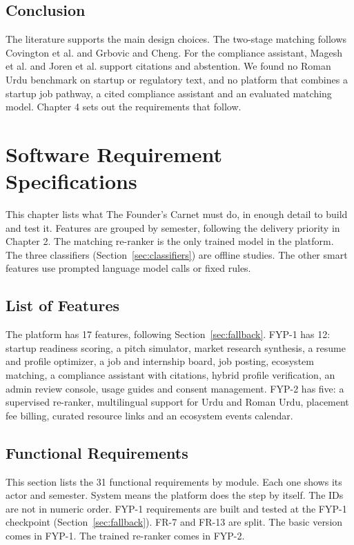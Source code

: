 \documentclass{FastFyp}
\begin{document}
\section{Conclusion}
The literature supports the main design choices. The two-stage matching follows Covington et al. and Grbovic and Cheng. For the compliance assistant, Magesh et al. and Joren et al. support citations and abstention. We found no Roman Urdu benchmark on startup or regulatory text, and no platform that combines a startup job pathway, a cited compliance assistant and an evaluated matching model. Chapter 4 sets out the requirements that follow.

\chapter{Software Requirement Specifications}
This chapter lists what The Founder's Carnet must do, in enough detail to build and test it. Features are grouped by semester, following the delivery priority in Chapter 2. The matching re-ranker is the only trained model in the platform. The three classifiers (Section~\ref{sec:classifiers}) are offline studies. The other smart features use prompted language model calls or fixed rules.

\section{List of Features}
The platform has 17 features, following Section~\ref{sec:fallback}. FYP-1 has 12: startup readiness scoring, a pitch simulator, market research synthesis, a resume and profile optimizer, a job and internship board, job posting, ecosystem matching, a compliance assistant with citations, hybrid profile verification, an admin review console, usage guides and consent management. FYP-2 has five: a supervised re-ranker, multilingual support for Urdu and Roman Urdu, placement fee billing, curated resource links and an ecosystem events calendar.

\section{Functional Requirements}\label{sec:fr}
This section lists the 31 functional requirements by module. Each one shows its actor and semester. System means the platform does the step by itself. The IDs are not in numeric order. FYP-1 requirements are built and tested at the FYP-1 checkpoint (Section~\ref{sec:fallback}). FR-7 and FR-13 are split. The basic version comes in FYP-1. The trained re-ranker comes in FYP-2.
\end{document}
